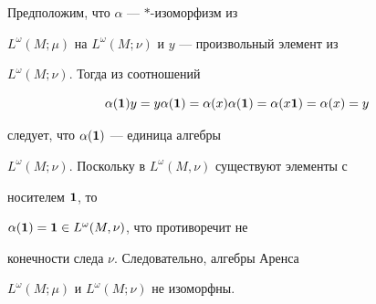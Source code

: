  


\begin{pf} 


Предположим, что $\alpha$ --- $*$-изоморфизм из 


$L^\omega(M;\mu)$ на $L^\omega(M;\nu)$ и $y$ --- произвольный элемент из 


$L^\omega(M;\nu)$. Тогда из соотношений 


$$ 


\alpha(\bold 1)y=y\alpha(\bold 1)=\alpha(x)\alpha(\bold 1)= 


\alpha(x\bold 1)=\alpha(x)=y 


$$ 


следует, что $\alpha(\bold 1)$ --- единица алгебры 


$L^\omega(M;\nu)$. Поскольку в $L^\omega(M,\nu)$ существуют элементы с 


носителем $\bold 1$, то 


$\alpha(\bold 1)=\bold 1\in L^\omega(M,\nu)$, что противоречит не 


конечности следа $\nu$. Следовательно, алгебры Аренса 


$L^\omega(M;\mu)$ и $L^\omega(M;\nu)$ не изоморфны. 


\end{pf} 


 


 


